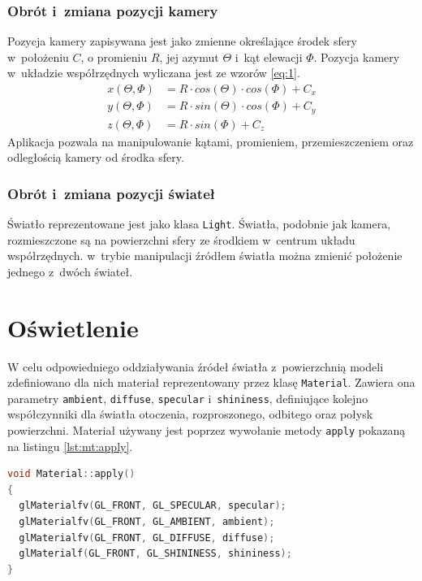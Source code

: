 \subsubsection{Obrót i~zmiana pozycji kamery}
Pozycja kamery zapisywana jest jako zmienne określające środek sfery w~położeniu $C$, o promieniu $R$, jej azymut $\Theta$ i~kąt elewacji $\Phi$. Pozycja kamery w~układzie współrzędnych wyliczana jest ze wzorów \ref{eq:1}.
\begin{subequations}
    \label{eq:1}
    \begin{align}  
        x(\Theta, \Phi) &= R \cdot cos(\Theta) \cdot cos(\Phi) + C_x\\
        y(\Theta, \Phi) &= R \cdot sin(\Theta) \cdot cos(\Phi) + C_y\\
        z(\Theta, \Phi) &= R \cdot sin(\Phi) + C_z
    \end{align}  
\end{subequations}
Aplikacja pozwala na manipulowanie kątami, promieniem, przemieszczeniem oraz odległością kamery od środka sfery.
\subsubsection{Obrót i~zmiana pozycji świateł}
Światło reprezentowane jest jako klasa \lstinline{Light}. Światła, podobnie jak kamera, rozmieszczone są na powierzchni sfery ze środkiem w~centrum układu współrzędnych. w~trybie manipulacji źródłem światła można zmienić położenie jednego z~dwóch świateł.
\clearpage
\section{Oświetlenie}
W celu odpowiedniego oddziaływania źródeł światła z~powierzchnią modeli zdefiniowano dla nich materiał reprezentowany przez klasę \lstinline{Material}. Zawiera ona parametry \lstinline{ambient}, \lstinline{diffuse}, \lstinline{specular} i~\lstinline{shininess}, definiujące kolejno współczynniki dla światła otoczenia, rozproszonego, odbitego oraz połysk powierzchni. Materiał używany jest poprzez wywołanie metody \lstinline{apply} pokazaną na listingu \ref{lst:mt:apply}.

\begin{lstlisting}[language=C++, caption=Metoda \lstinline{apply} klasy materiału., label={lst:mt:apply}]
void Material::apply()
{
  glMaterialfv(GL_FRONT, GL_SPECULAR, specular);
  glMaterialfv(GL_FRONT, GL_AMBIENT, ambient);
  glMaterialfv(GL_FRONT, GL_DIFFUSE, diffuse);
  glMaterialf(GL_FRONT, GL_SHININESS, shininess);
}
\end{lstlisting}


